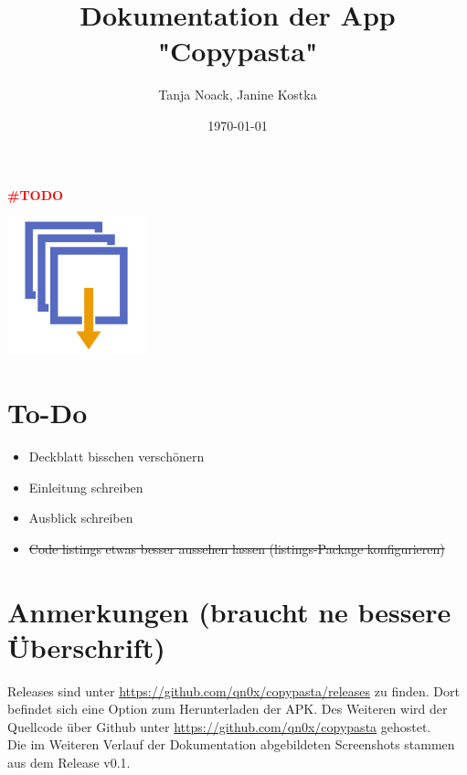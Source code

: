 \documentclass[11pt]{article}
\title{Dokumentation der App "Copypasta"}
\author{Tanja Noack, Janine Kostka}
\date{\today}
\begin{document}
	\begin{titlepage}
		\centering
		\maketitle
		\thispagestyle{empty}
		\textcolor{red}{\textbf{{\LARGE \#TODO}}}
		
		\vspace{2cm}
		\includegraphics[width=0.3\textwidth]{Konzepte/logo.png}\par\vspace{1cm}
		
		\vfill
	\end{titlepage}
	\pagebreak
	
	
	\tableofcontents
	\pagebreak
	
	
\section*{To-Do}
	\begin{itemize}
		\item Deckblatt bisschen verschönern
		\item Einleitung schreiben
		\item Ausblick schreiben
		\item \sout{Code listings etwas besser aussehen lassen (listings-Package konfigurieren)}
	\end{itemize}

\section*{Anmerkungen (braucht ne bessere Überschrift)}
	Releases sind unter \sloppy\url{https://github.com/qn0x/copypasta/releases} zu finden. Dort befindet sich eine Option zum Herunterladen der APK.  
	Des Weiteren wird der Quellcode über Github unter \sloppy\url{https://github.com/qn0x/copypasta} gehostet. \\
	Die im Weiteren Verlauf der Dokumentation abgebildeten Screenshots stammen aus dem Release v0.1.
\end{document}
